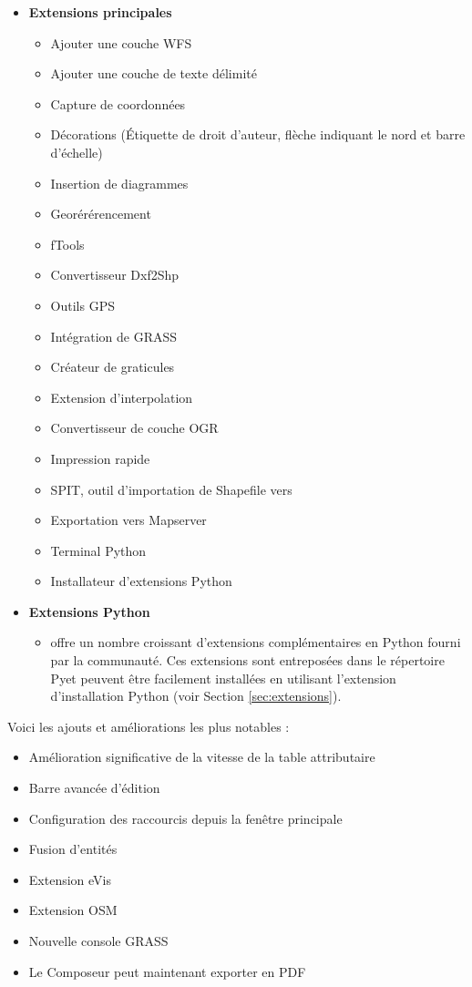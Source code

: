 \begin{itemize}[label=--]
\item \textbf{Extensions principales}
\begin{itemize}[label=,leftmargin=*]
\item Ajouter une couche WFS 
\item Ajouter une couche de texte délimité
\item Capture de coordonnées
\item Décorations (Étiquette de droit d'auteur, flèche indiquant le nord et barre d'échelle)
\item Insertion de diagrammes
\item Georérérencement
\item fTools
\item Convertisseur Dxf2Shp
\item Outils GPS
\item Intégration de GRASS
\item Créateur de graticules
\item Extension d'interpolation
\item Convertisseur de couche OGR
\item Impression rapide
\item SPIT, outil d'importation de Shapefile vers \ppg
\item Exportation vers Mapserver
\item Terminal Python
\item Installateur d'extensions Python
\end{itemize}
\item \textbf{Extensions Python}
\begin{itemize}[label=,leftmargin=*]
\item \qg offre un nombre croissant d'extensions complémentaires en Python fourni par la communauté. Ces extensions sont entreposées dans le répertoire Py\qg et peuvent être facilement installées en utilisant l'extension d'installation Python (voir Section \ref{sec:extensions}).
\end{itemize}
\end{itemize}

Voici les ajouts et améliorations les plus notables :

\begin{itemize}[label=--]
\item Amélioration significative de la vitesse de la table attributaire
\item Barre avancée d'édition
\item Configuration des raccourcis depuis la fenêtre principale
\item Fusion d'entités 
\item Extension eVis
\item Extension OSM
\item Nouvelle console GRASS
\item Le Composeur peut maintenant exporter en PDF
\end{itemize}
